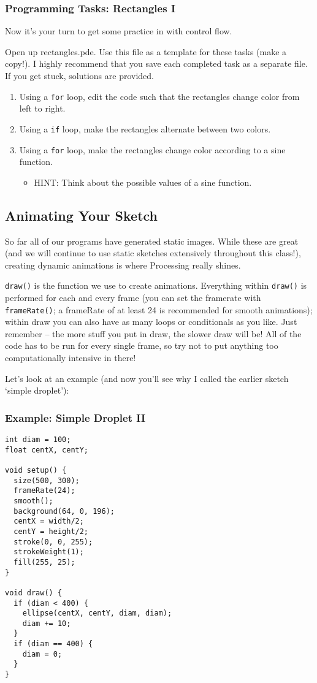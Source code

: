 \subsubsection{Programming Tasks: Rectangles I}
Now it's your turn to get some practice in with control flow.

Open up rectangles.pde.  Use this file as a template for these tasks (make a copy!).  I highly recommend that you save each completed task as a separate file.  If you get stuck, solutions are provided.

\begin{enumerate}
\item Using a \texttt{for} loop, edit the code such that the rectangles change color from left to right.
\item Using a \texttt{if} loop, make the rectangles alternate between two colors.
\item Using a \texttt{for} loop, make the rectangles change color according to a sine function.
\begin{itemize}
\item HINT: Think about the possible values of a sine function.
\end{itemize}
\end{enumerate}

\subsection{Animating Your Sketch}
So far all of our programs have generated static images.  While these are great (and we will continue to use static sketches extensively throughout this class!), creating dynamic animations is where Processing really shines.

\texttt{draw()} is the function we use to create animations.  Everything within \texttt{draw()} is performed for each and every frame (you can set the framerate with \texttt{frameRate()}; a frameRate of at least 24 is recommended for smooth animations); within draw you can also have as many loops or conditionals as you like.  Just remember -- the more stuff you put in draw, the slower draw will be!  All of the code has to be run for every single frame, so try not to put anything too computationally intensive in there!

Let's look at an example (and now you'll see why I called the earlier sketch `simple droplet'):

\subsubsection{Example: Simple Droplet II}
\begin{verbatim}
int diam = 100;
float centX, centY;

void setup() {
  size(500, 300);
  frameRate(24);
  smooth();
  background(64, 0, 196);
  centX = width/2;
  centY = height/2;
  stroke(0, 0, 255);
  strokeWeight(1);
  fill(255, 25);
}

void draw() {
  if (diam < 400) {
    ellipse(centX, centY, diam, diam);
    diam += 10;
  }
  if (diam == 400) {
    diam = 0;
  }
}
\end{verbatim}

